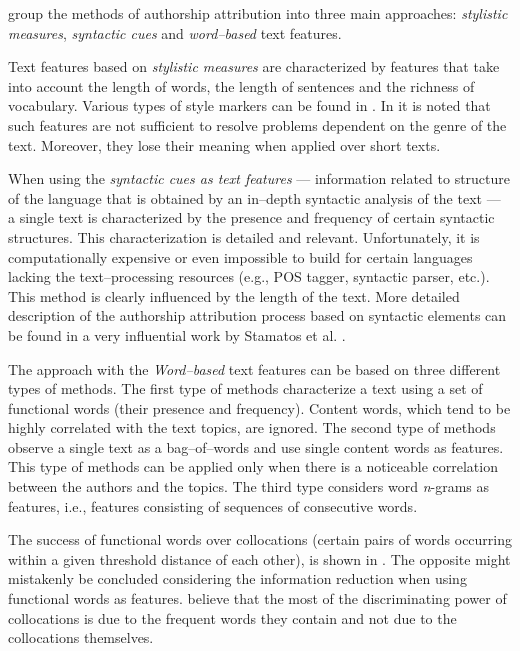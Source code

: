 \documentclass[11pt,english]{article}
\begin{document}
\begin{multicols}{2}
\citet{coyotl2006authorship} group the methods of authorship attribution into three
main approaches: \emph{stylistic measures}, \emph{syntactic cues} and
\emph{word--based} text features.

Text features based on \emph{stylistic measures} are characterized by features that
take into account the length of words, the length of sentences and the richness of vocabulary.
Various types of style markers can be found in
\citep{luyckx2005shallow}. In \citep{coyotl2006authorship} it is noted that such
features are not sufficient to resolve problems dependent on the genre of the
text. Moreover, they lose their meaning when applied over short texts.

When using the \emph{syntactic cues as text features} --- information
related to structure of the language that is obtained by an in--depth syntactic
analysis of the text --- a single text is characterized by the presence and
frequency of certain syntactic structures. This characterization is detailed and relevant.
Unfortunately, it is computationally expensive or even impossible to build for
certain languages lacking the text--processing resources (e.g., POS tagger, syntactic
parser, etc.). This method is clearly influenced by the length of the text. More detailed 
description of the authorship attribution process based on syntactic elements can be found 
in a very influential work by Stamatos et al. \citep{stamatatos2001computer}.

The approach with the \emph{Word--based} text features can be based on three
different types of methods. The first type of methods characterize a text
using a set of functional words (their presence and frequency). Content words, which 
tend to be highly correlated with the text topics, are ignored. The second type
of methods observe a single text as a bag--of--words and use single content words as
features. This type of methods can be applied only when there is a noticeable
correlation between the authors and the topics. The third type considers
word \emph{n}-grams as features, i.e., features consisting of sequences of
consecutive words.

The success of functional words over collocations (certain pairs of words
occurring within a given threshold distance of each other), is shown in
\citep{argamon2005measuring}. The opposite might mistakenly be concluded considering
the information reduction when using functional words as features.
\citet{argamon2005measuring} believe that the most of the discriminating power
of collocations is due to the frequent words they contain and not due to the
collocations themselves.


\end{multicols}
\end{document}
